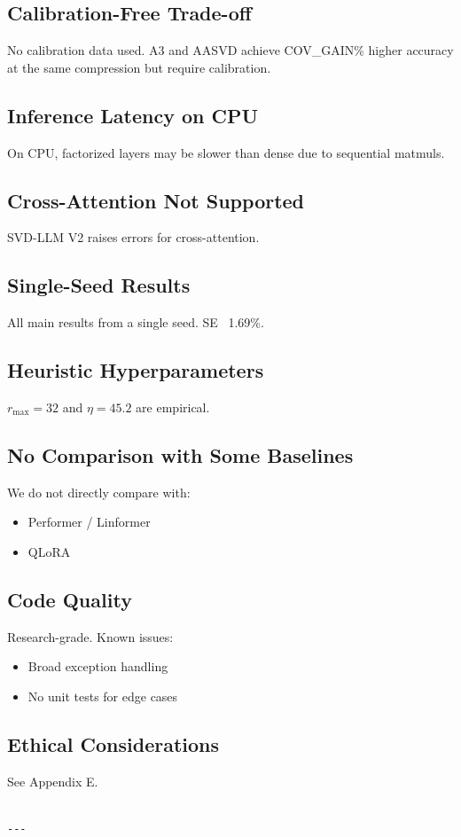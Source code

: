 \subsection{Calibration-Free Trade-off}

No calibration data used. A3 and AASVD achieve {{COV\_GAIN}}\% higher accuracy 
at the same compression but require calibration.

\subsection{Inference Latency on CPU}

On CPU, factorized layers may be slower than dense due to sequential matmuls.

\subsection{Cross-Attention Not Supported}

SVD-LLM V2 raises errors for cross-attention.

\subsection{Single-Seed Results}

All main results from a single seed. SE ~1.69\%.

\subsection{Heuristic Hyperparameters}

$r_\text{max} = 32$ and $\eta = 45.2$ are empirical.

\subsection{No Comparison with Some Baselines}

We do not directly compare with:
\begin{itemize}
\item Performer / Linformer
\item QLoRA

\end{itemize}
\subsection{Code Quality}

Research-grade. Known issues:
\begin{itemize}
\item Broad exception handling
\item No unit tests for edge cases

\end{itemize}
\subsection{Ethical Considerations}

See Appendix E.
\begin{lstlisting}

---
\end{lstlisting}